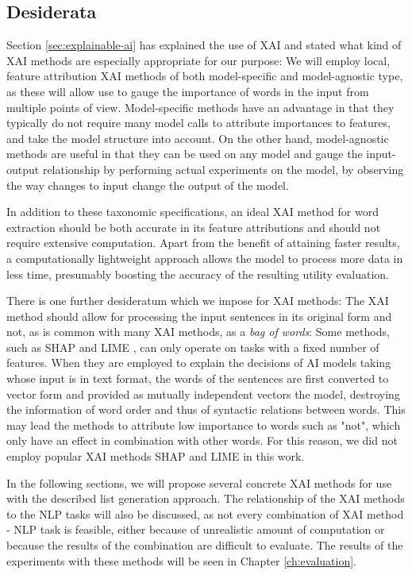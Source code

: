 \subsection{Desiderata}
Section \ref{sec:explainable-ai} has explained the use of XAI and stated what kind of XAI methods are especially appropriate for our purpose:
We will employ local, feature attribution XAI methods of both model-specific and model-agnostic type, as these will allow use to gauge the importance of words in the input from multiple points of view.
Model-specific methods have an advantage in that they typically do not require many model calls to attribute importances to features, and take the model structure into account.
On the other hand, model-agnostic methods are useful in that they can be used on any model and gauge the input-output relationship by performing actual experiments on the model, by observing the way changes to input change the output of the model.

In addition to these taxonomic specifications, an ideal XAI method for word extraction should be both accurate in its feature attributions and should not require extensive computation.
Apart from the benefit of attaining faster results, a computationally lightweight approach allows the model to process more data in less time, presumably boosting the accuracy of the resulting utility evaluation.

There is one further desideratum which we impose for XAI methods:
The XAI method should allow for processing the input sentences in its original form and not, as is common with many XAI methods, as a \textit{bag of words}:
Some methods, such as SHAP and LIME , can only operate on tasks with a fixed number of features.
When they are employed to explain the decisions of AI models taking whose input is in text format, the words of the sentences are first converted to vector form and provided as mutually independent vectors the model, destroying the information of word order and thus of syntactic relations between words.
This may lead the methods to attribute low importance to words such as "not", which only have an effect in combination with other words.
For this reason, we did not employ popular XAI methods SHAP and LIME in this work.


In the following sections, we will propose several concrete XAI methods for use with the described list generation approach.
The relationship of the XAI methods to the NLP tasks will also be discussed, as not every combination of XAI method - NLP task is feasible, either because of unrealistic amount of computation or because the results of the combination are difficult to evaluate.
The results of the experiments with these methods will be seen in Chapter \ref{ch:evaluation}.

